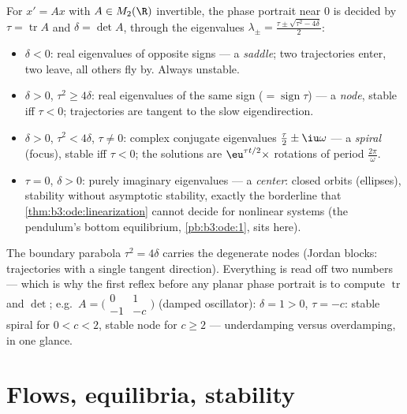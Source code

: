 \begin{example}
\label{ex:b3:ode:planeclassification}
For $x' = Ax$ with $A \in M_2(\R)$ invertible, the phase
portrait near $0$ is decided by $\tau = \operatorname{tr}A$
and $\delta = \det A$, through the eigenvalues $\lambda_\pm
= \frac{\tau \pm \sqrt{\tau^2 - 4\delta}}2$:
\begin{itemize}
  \item $\delta < 0$: real eigenvalues of opposite signs ---
        a \emph{saddle}; two trajectories enter, two leave,
        all others fly by. Always unstable.
  \item $\delta > 0$, $\tau^2 \geq 4\delta$: real eigenvalues
        of the same sign ($= \operatorname{sign}\tau$) --- a
        \emph{node}, stable iff $\tau < 0$; trajectories are
        tangent to the slow eigendirection.
  \item $\delta > 0$, $\tau^2 < 4\delta$, $\tau \neq 0$:
        complex conjugate eigenvalues $\frac\tau2 \pm
        \iu\omega$ --- a \emph{spiral} (focus), stable iff
        $\tau < 0$; the solutions are
        $\eu^{\tau t/2}\times$ rotations of period
        $\frac{2\pi}\omega$.
  \item $\tau = 0$, $\delta > 0$: purely imaginary
        eigenvalues --- a \emph{center}: closed orbits
        (ellipses), stability without asymptotic stability,
        exactly the borderline that
        \cref{thm:b3:ode:linearization} cannot decide for
        nonlinear systems (the pendulum's bottom equilibrium,
        \cref{pb:b3:ode:1}, sits here).
\end{itemize}
The boundary parabola $\tau^2 = 4\delta$ carries the
degenerate nodes (Jordan blocks: trajectories with a single
tangent direction). Everything is read off two numbers ---
which is why the first reflex before any planar phase
portrait is to compute $\operatorname{tr}$ and $\det$; e.g.\
$A = \bigl(\begin{smallmatrix}0 & 1\\ -1 &
-c\end{smallmatrix}\bigr)$ (damped oscillator): $\delta = 1 >
0$, $\tau = -c$: stable spiral for $0 < c < 2$, stable node
for $c \geq 2$ --- underdamping versus overdamping, in one
glance.
\end{example}

\section{Flows, equilibria, stability}

